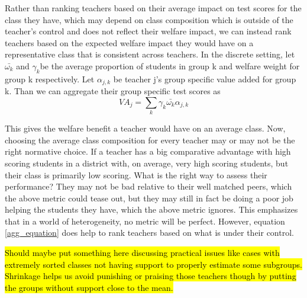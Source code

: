 \documentclass{article}
\theoremstyle{definition}
\theoremstyle{definition}
\theoremstyle{definition}
\theoremstyle{definition}
\begin{document}
        Rather than ranking teachers based on their average impact on test scores for the class they have, which may depend on class composition which is outside of the teacher's control and does not reflect their welfare impact, we can instead rank teachers based on the expected welfare impact they would have on a representative class that is consistent across teachers. In the discrete setting, let $\bar{\omega_k}$ and $\gamma_k$be the average proportion of students in group k and welfare weight for group k respectively. Let $\alpha_{j,k}$ be teacher j's group specific value added for group k. Than we can aggregate their group specific test scores as 
        \begin{equation}
        \label{agg_equation}
            VA_j = \sum_k \gamma_k \bar{\omega_k} \alpha_{j,k}
        \end{equation}
        
        This gives the welfare benefit a teacher would have on an average class. Now, choosing the average class composition for every teacher may or may not be the right normative choice. If a teacher has a big comparative advantage with high scoring students in a district with, on average, very high scoring students, but their class is primarily low scoring. What is the right way to assess their performance? They may not be bad relative to their well matched peers, which the above metric could tease out, but they may still in fact be doing a poor job helping the students they have, which the above metric ignores. This emphasizes that in a world of heterogeneity, no metric will be perfect. However, equation \ref{agg_equation} does help to rank teachers based on what is under their control. 
        
        \hl{Should maybe put something here discussing practical issues like cases with extremely sorted classes not having support to properly estimate some subgroups. Shrinkage helps us avoid punishing or praising those teachers though by putting the groups without support close to the mean.}

\end{document}
